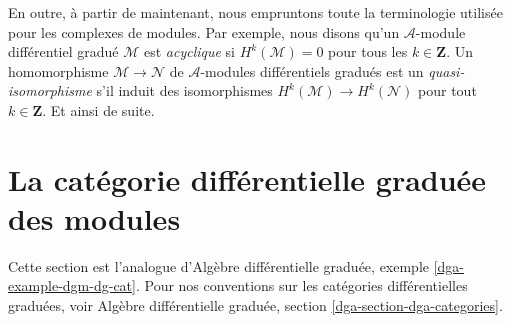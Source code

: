 \medskip\noindent En
outre, à partir de maintenant, nous empruntons toute la terminologie
utilisée pour les complexes de modules. Par exemple, nous disons
qu'un $\mathcal{A}$-module différentiel gradué $\mathcal{M}$ est {\it acyclique}
si $H^k(\mathcal{M}) = 0$ pour tous les $k \in \mathbf{Z}$.
Un homomorphisme $\mathcal{M} \to \mathcal{N}$
de $\mathcal{A}$-modules différentiels gradués est un {\it quasi-isomorphisme}
s'il induit des isomorphismes $H^k(\mathcal{M}) \to H^k(\mathcal{N})$
pour tout $k \in \mathbf{Z}$. Et ainsi de suite.


















\section{La catégorie différentielle graduée des modules}
\label{section-dgm-dg-cat}

\noindent
Cette section est l'analogue
d'Algèbre différentielle graduée, exemple \ref{dga-example-dgm-dg-cat}.
Pour nos conventions sur les catégories différentielles graduées,
voir Algèbre différentielle graduée, section \ref{dga-section-dga-categories}.

